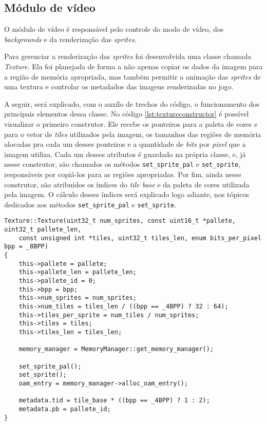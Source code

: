 \subsection{Módulo de vídeo} \label{modulo-video}

O módulo de vídeo é responsável pelo controle do modo de vídeo, dos \textit{backgrounds} e da renderização das \textit{sprites}.

Para gerenciar a renderização das \textit{sprites} foi desenvolvida uma classe chamada \textit{Texture}. Ela foi planejada de forma a não apenas copiar os dados da imagem para a região de memória apropriada, mas também permitir a animação das \textit{sprites} de uma textura e controlar os metadados das imagens renderizadas no jogo.

A seguir, será explicado, com o auxílo de trechos do código, o funcionamento dos principais elementos dessa classe. No código \ref{lst:textureconstructor} é possível visualizar o primeiro construtor. Ele recebe os ponteiros para a paleta de cores e para o vetor de \textit{tiles} utilizados pela imagem, os tamanhos das regiões de memória alocadas pra cada um desses ponteiros e a quantidade de \textit{bits} por \textit{pixel} que a imagem utiliza. Cada um desses atributos é guardado na própria classe, e, já nesse construtor, são chamados os métodos \texttt{set\_sprite\_pal} e \texttt{set\_sprite}, responsáveis por copiá-los para as regiões apropriadas. Por fim, ainda nesse construtor, são atribuídos os índices do \textit{tile base} e da paleta de cores utilizada pela imagem. O cálculo desses índices será explicado logo adiante, nos tópicos dedicados aos métodos \texttt{set\_sprite\_pal} e \texttt{set\_sprite}.

\begin{lstlisting}[float,caption={Construtor da classe \texttt{Texture}.},label={lst:textureconstructor}]
Texture::Texture(uint32_t num_sprites, const uint16_t *pallete, uint32_t pallete_len,
    const unsigned int *tiles, uint32_t tiles_len, enum bits_per_pixel bpp = _8BPP)
{
    this->pallete = pallete;
    this->pallete_len = pallete_len;
    this->pallete_id = 0;
    this->bpp = bpp;
    this->num_sprites = num_sprites;
    this->num_tiles = tiles_len / ((bpp == _4BPP) ? 32 : 64);
    this->tiles_per_sprite = num_tiles / num_sprites;
    this->tiles = tiles;
    this->tiles_len = tiles_len;

    memory_manager = MemoryManager::get_memory_manager();

    set_sprite_pal();
    set_sprite();
    oam_entry = memory_manager->alloc_oam_entry();

    metadata.tid = tile_base * ((bpp == _4BPP) ? 1 : 2);
    metadata.pb = pallete_id;
}
\end{lstlisting}

